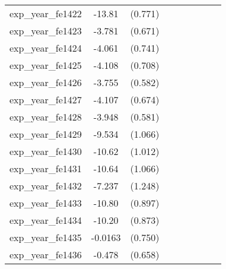 {\begin{tabular}{l*{4}{cc}}
exp\_year\_fe1422&   -13.81\sym{***}&  (0.771)&                  &         &                  &         &                  &         \\
exp\_year\_fe1423&   -3.781\sym{***}&  (0.671)&                  &         &                  &         &                  &         \\
exp\_year\_fe1424&   -4.061\sym{***}&  (0.741)&                  &         &                  &         &                  &         \\
exp\_year\_fe1425&   -4.108\sym{***}&  (0.708)&                  &         &                  &         &                  &         \\
exp\_year\_fe1426&   -3.755\sym{***}&  (0.582)&                  &         &                  &         &                  &         \\
exp\_year\_fe1427&   -4.107\sym{***}&  (0.674)&                  &         &                  &         &                  &         \\
exp\_year\_fe1428&   -3.948\sym{***}&  (0.581)&                  &         &                  &         &                  &         \\
exp\_year\_fe1429&   -9.534\sym{***}&  (1.066)&                  &         &                  &         &                  &         \\
exp\_year\_fe1430&   -10.62\sym{***}&  (1.012)&                  &         &                  &         &                  &         \\
exp\_year\_fe1431&   -10.64\sym{***}&  (1.066)&                  &         &                  &         &                  &         \\
exp\_year\_fe1432&   -7.237\sym{***}&  (1.248)&                  &         &                  &         &                  &         \\
exp\_year\_fe1433&   -10.80\sym{***}&  (0.897)&                  &         &                  &         &                  &         \\
exp\_year\_fe1434&   -10.20\sym{***}&  (0.873)&                  &         &                  &         &                  &         \\
exp\_year\_fe1435&  -0.0163         &  (0.750)&                  &         &                  &         &                  &         \\
exp\_year\_fe1436&   -0.478         &  (0.658)&                  &         &                  &         &                  &         \\

\end{tabular}}
